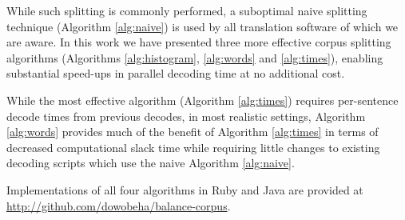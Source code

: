 \documentclass{pbml}
\begin{document}
While such splitting is commonly performed, a suboptimal naive splitting technique (Algorithm \ref{alg:naive}) is used by all translation software of which we are aware. 
%
In this work we have presented three more effective corpus splitting algorithms (Algorithms \ref{alg:histogram}, \ref{alg:words} and \ref{alg:times}), 
% 
enabling substantial speed-ups in parallel decoding time at no additional cost.

While the most effective algorithm (Algorithm \ref{alg:times}) requires per-sentence decode times from previous decodes, in most realistic settings, Algorithm \ref{alg:words} provides much of the benefit of Algorithm \ref{alg:times} in terms of decreased computational slack time while requiring little changes to existing decoding scripts which use the naive Algorithm \ref{alg:naive}.


Implementations of all four algorithms in Ruby and Java are provided at \url{http://github.com/dowobeha/balance-corpus}.





















\clearpage
{}


\end{document}
